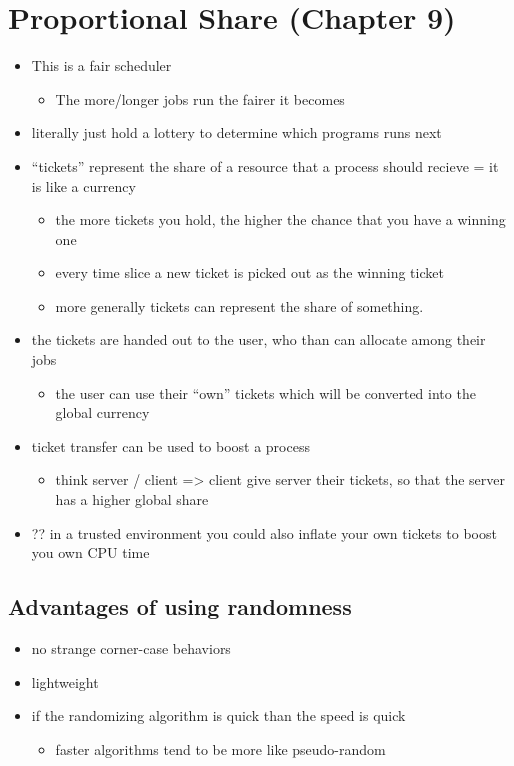 \documentclass[11pt]{report}
\begin{document}
\chapter{Proportional Share (Chapter 9)}
\label{sec:org0922768}
\begin{itemize}
\item This is a fair scheduler
\begin{itemize}
\item The more/longer jobs run the fairer it becomes
\end{itemize}
\item literally just hold a lottery to determine which programs runs next
\item ``tickets'' represent the share of a resource that a process should recieve = it is like a currency
\begin{itemize}
\item the more tickets you hold, the higher the chance that you have a winning one
\item every time slice a new ticket is picked out as the winning ticket
\item more generally tickets can represent the share of something.
\end{itemize}
\item the tickets are handed out to the user, who than can allocate among their jobs
\begin{itemize}
\item the user can use their ``own'' tickets which will be converted into the global currency
\end{itemize}
\item ticket transfer can be used to boost a process
\begin{itemize}
\item think server / client => client give server their tickets, so that the server has a higher global share
\end{itemize}
\item ?? in a trusted environment you could also inflate your own tickets to boost you own CPU time
\end{itemize}
\section{Advantages of using randomness}
\label{sec:org26fc12b}
\begin{itemize}
\item no strange corner-case behaviors
\item lightweight
\item if the randomizing algorithm is quick than the speed is quick
\begin{itemize}
\item faster algorithms tend to be more like pseudo-random
\end{itemize}
\end{itemize}
\end{document}
